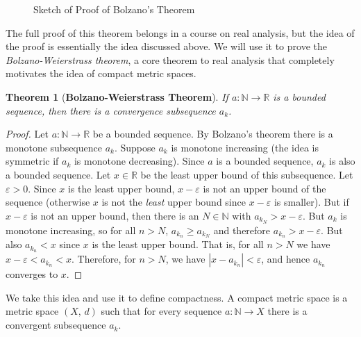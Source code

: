 \documentclass{article}
\theoremstyle{plain}
\newtheorem{theorem}{Theorem}[section]
\theoremstyle{normal}
\newenvironment{definition}{%
    \pushQED{\qed}\renewcommand{\qedsymbol}{$\blacksquare$}\definitionx%
}{%
    \popQED\enddefinitionx%
}
\begin{document}
        \begin{figure}
            \centering
            \caption{Sketch of Proof of Bolzano's Theorem}
            \label{fig:monotone_subsequence_theorem_001}
        \end{figure}
        \par\hfill\par
        The full proof of this theorem belongs in a
        course on real analysis, but the idea of the proof is essentially the
        idea discussed above. We will use it to prove the
        \textit{Bolzano-Weierstrass theorem}, a core theorem to real analysis
        that completely motivates the idea of compact metric spaces.
        \begin{theorem}[\textbf{Bolzano-Weierstrass Theorem}]
            If $a:\mathbb{N}\rightarrow\mathbb{R}$ is a bounded sequence,
            then there is a convergence subsequence $a_{k}$.
        \end{theorem}
        \begin{proof}
            Let $a:\mathbb{N}\rightarrow\mathbb{R}$ be a bounded sequence.
            By Bolzano's theorem there is a monotone subsequence $a_{k}$.
            Suppose $a_{k}$ is monotone increasing (the idea is symmetric if
            $a_{k}$ is monotone decreasing). Since $a$ is a bounded sequence,
            $a_{k}$ is also a bounded sequence. Let $x\in\mathbb{R}$ be the
            least upper bound of this subsequence. Let $\varepsilon>0$. Since
            $x$ is the least upper bound, $x-\varepsilon$ is not an upper
            bound of the sequence (otherwise $x$ is not the \textit{least}
            upper bound since $x-\varepsilon$ is smaller). But if
            $x-\varepsilon$ is not an upper bound, then there is an
            $N\in\mathbb{N}$ with $a_{k_{N}}>x-\varepsilon$. But $a_{k}$
            is monotone increasing, so for all $n>N$, $a_{k_{n}}\geq{a}_{k_{N}}$
            and therefore $a_{k_{n}}>x-\varepsilon$. But also
            $a_{k_{n}}<x$ since $x$ is the least upper bound. That is,
            for all $n>N$ we have
            $x-\varepsilon<a_{k_{n}}<x$. Therefore, for $n>N$, we have
            $|x-a_{k_{n}}|<\varepsilon$, and hence $a_{k_{n}}$ converges to $x$.
        \end{proof}
        We take this idea and use it to define compactness.
        \begin{definition}[\textbf{Compact Metric Space}]
            A compact metric space is a metric space $(X,\,d)$ such that
            for every sequence $a:\mathbb{N}\rightarrow{X}$ there is a
            convergent subsequence $a_{k}$.
        \end{definition}
\end{document}
